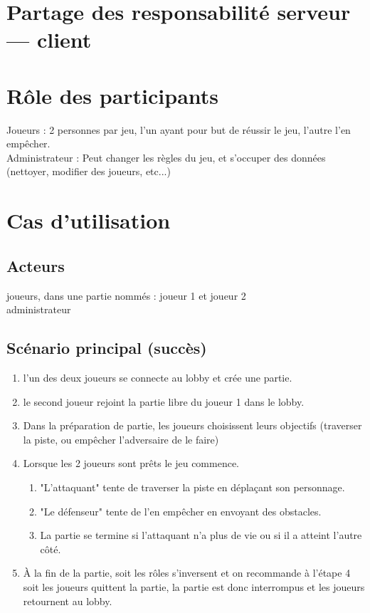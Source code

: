 \documentclass[a4paper,11pt]{article}
\begin{document}
	\section{Partage des responsabilité serveur --- client}

	\section{Rôle des participants}

		Joueurs : 2 personnes par jeu, l'un ayant pour but de réussir le jeu, l'autre l'en empêcher. \\
		Administrateur : Peut changer les règles du jeu, et s'occuper des données (nettoyer, modifier des joueurs, etc...)

	\section{Cas d'utilisation}
		\subsection{Acteurs}
			joueurs, dans une partie nommés : joueur 1 et joueur 2 \\
			administrateur
		\subsection{Scénario principal (succès)}
		\begin{enumerate}
			\item l'un des deux joueurs se connecte au lobby et crée une partie.
			\item le second joueur rejoint la partie libre du joueur 1 dans le lobby.
			\item Dans la préparation de partie, les joueurs choisissent leurs objectifs (traverser la piste, ou empêcher l'adversaire de le faire)
			\item Lorsque les 2 joueurs sont prêts le jeu commence.
			\begin{enumerate}
				\item "L'attaquant" tente de traverser la piste en déplaçant son personnage.
				\item "Le défenseur" tente de l'en empêcher en envoyant des obstacles.
				\item La partie se termine si l'attaquant n'a plus de vie ou si il a atteint l'autre côté.
			\end{enumerate}
			\item À la fin de la partie, soit les rôles s'inversent et on recommande à l'étape 4 soit les joueurs quittent la partie, la partie est donc interrompus et les joueurs retournent au lobby.
		\end{enumerate}
\end{document}
